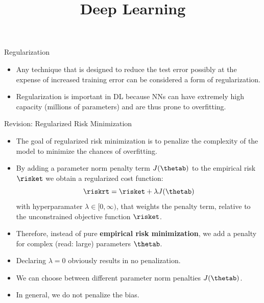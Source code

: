 




\newcommand{\titlefigure}{figure/regu_pic.png}
\newcommand{\learninggoals}{
  \item Regularized cost functions
  \item Norm penalties
  \item Weight decay
  \item Equivalence with constrained optimization
}

\title{Deep Learning}
\date{}




\begin{frame} {Regularization}
\begin{itemize}
\item Any technique that is designed to reduce the test error possibly at the expense of increased training error can be considered a form of regularization.
\item Regularization is important in DL because NNs can have extremely high capacity (millions of parameters) and are thus prone to overfitting.
\end{itemize}
\end{frame}

\begin{vbframe}{Revision: Regularized Risk Minimization}
\begin{itemize}
\item The goal of regularized risk minimization is to penalize the complexity of the model to minimize the chances of overfitting.
\item By adding a parameter norm penalty term \(J(\thetab)\) to the empirical risk $\risket$ we obtain a regularized cost function:
$$\riskrt = \risket + \lambda \text{\(J(\thetab)\)}$$
with hyperparamater $\lambda \in [0, \infty)$, that weights the penalty term, relative to the unconstrained objective function $\risket$.
\item Therefore, instead of pure \textbf{empirical risk minimization}, we add a penalty
for complex (read: large) parameters \(\thetab\).
\item Declaring $\lambda = 0$ obviously results in no penalization.
\item We can choose between different parameter norm penalties \(J(\thetab)\).
\item In general, we do not penalize the bias.
\end{itemize}
\end{vbframe}

